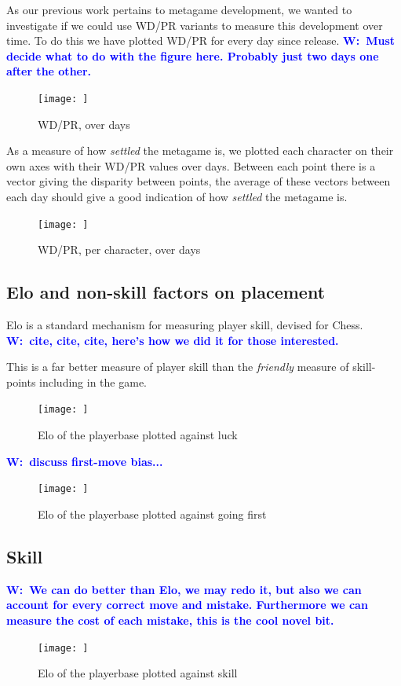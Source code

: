 \documentclass{tufte-handout}
\newcommand{\WilliamToDo}[1]{\textcolor{blue}{\textbf{W:~{#1}}}}
\begin{document}
As our previous work pertains to metagame development, we wanted to investigate if we could use WD/PR variants to measure this development over time. To do this we have plotted WD/PR for every day since release. \WilliamToDo{Must decide what to do with the figure here. Probably just two days one after the other.}

\begin{figure}
    \centering
    \texttt{[image: ]}
    \caption{WD/PR, over days}
    \label{fig:my_label}
\end{figure}

As a measure of how \textit{settled} the metagame is, we plotted each character on their own axes with their WD/PR values over days. Between each point there is a vector giving the disparity between points, the average of these vectors between each day should give a good indication of how \textit{settled} the metagame is.

\begin{figure}
    \centering
    \texttt{[image: ]}
    \caption{WD/PR, per character, over days}
    \label{fig:my_label}
\end{figure}

\subsection{Elo and non-skill factors on placement}

Elo is a standard mechanism for measuring player skill, devised for Chess. \WilliamToDo{cite, cite, cite, here's how we did it for those interested.}

This is a far better measure of player skill than the \textit{friendly} measure of skill-points including in the game.

\begin{figure}
    \centering
    \texttt{[image: ]}
    \caption{Elo of the playerbase plotted against luck}
    \label{fig:my_label}
\end{figure}

\WilliamToDo{discuss first-move bias...}

\begin{figure}
    \centering
    \texttt{[image: ]}
    \caption{Elo of the playerbase plotted against going first}
    \label{fig:my_label}
\end{figure}

\subsection{Skill}

\WilliamToDo{We can do better than Elo, we may redo it, but also we can account for every correct move and mistake. Furthermore we can measure the cost of each mistake, \textbf{this is the cool novel bit.}}

\begin{figure}
    \centering
    \texttt{[image: ]}
    \caption{Elo of the playerbase plotted against skill}
    \label{fig:my_label}
\end{figure}

\newpage
\end{document}
